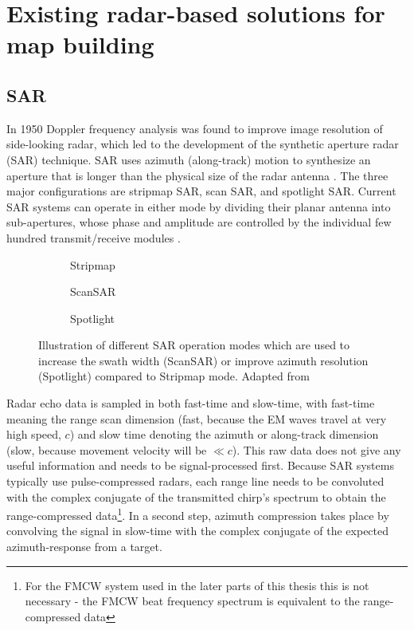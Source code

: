 \section{Existing radar-based solutions for map
building}\label{existing-radar-based-solutions-for-map-building}

\subsection{SAR}\label{sar}

In 1950 Doppler frequency analysis was found to improve image resolution
of side-looking radar, which led to the development of the synthetic
aperture radar (SAR) technique. SAR uses azimuth (along-track) motion to
synthesize an aperture that is longer than the physical size of the
radar antenna \cite{Wang2008}. The three major configurations are
stripmap SAR, scan SAR, and spotlight SAR. Current SAR systems can
operate in either mode by dividing their planar antenna into
sub-apertures, whose phase and amplitude are controlled by the
individual few hundred transmit/receive modules \cite{Moreira2013}.

\begin{figure}[htp]
    \label{fig:sar_modes}
    \begin{subfigure}{\linewidth}
        \centering
        \def\svgscale{1.0}
        
        \caption{Stripmap}
        \bigskip
    \end{subfigure}
    \begin{subfigure}{0.45\linewidth}
        \centering
        \def\svgscale{0.75}
        
        \caption{ScanSAR}
    \end{subfigure}
    \hfill
    \begin{subfigure}{0.45\linewidth}
        \centering
        \def\svgscale{0.75}
        
        \caption{Spotlight}
    \end{subfigure}
    \caption{Illustration of different SAR operation modes which are used to increase the swath width (ScanSAR) or improve azimuth resolution (Spotlight) compared to Stripmap mode. Adapted from \cite{Moreira2013}}
\end{figure}

Radar echo data is sampled in both fast-time and slow-time, with
fast-time meaning the range scan dimension (fast, because the EM waves
travel at very high speed, \(c\)) and slow time denoting the azimuth or
along-track dimension (slow, because movement velocity will be
\(\ll c\)). This raw data does not give any useful information and needs
to be signal-processed first. Because SAR systems typically use
pulse-compressed radars, each range line needs to be convoluted with the
complex conjugate of the transmitted chirp's spectrum to obtain the
range-compressed
data\footnote{For the FMCW system used in the later parts of this thesis this is not necessary - the FMCW beat frequency spectrum is equivalent to the range-compressed data}.
In a second step, azimuth compression takes place by convolving the
signal in slow-time with the complex conjugate of the expected
azimuth-response from a target.

